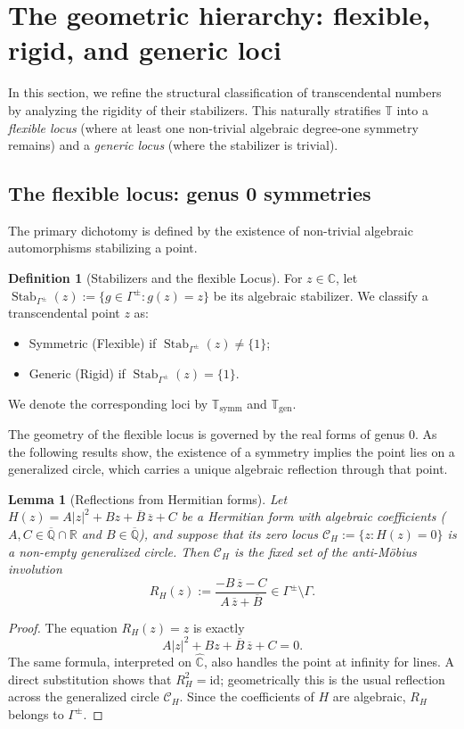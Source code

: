 \documentclass[11pt,a4paper]{article}
\theoremstyle{plain}
\newtheorem{lemma}[theorem]{Lemma}
\theoremstyle{definition}
\newtheorem{definition}[theorem]{Definition}
\newcommand{\C}{\mathbb{C}}
\newcommand{\id}{\mathrm{id}}
\newcommand{\R}{\mathbb{R}}
\newcommand{\rsphere}{\hat{\mathbb{C}}}
\newcommand{\Stab}{\operatorname{Stab}}
\newcommand{\Alg}{\overline{\mathbb{Q}}}
\newcommand{\trans}{\mathbb{T}}
\newcommand{\Tc}{\trans}
\newcommand{\ssymm}{\Tc_{\mathrm{symm}}}
\newcommand{\sgen}{\Tc_{\mathrm{gen}}}
\begin{document}
\section{The geometric hierarchy: flexible, rigid, and generic loci}\label{sec:symmetric-generic}

In this section, we refine the structural classification of transcendental numbers by analyzing the rigidity of their stabilizers. This naturally stratifies $\Tc$ into a \textit{flexible locus} (where at least one non-trivial algebraic degree-one symmetry remains) and a \textit{generic locus} (where the stabilizer is trivial).

\subsection{The flexible locus: genus 0 symmetries}

The primary dichotomy is defined by the existence of non-trivial algebraic automorphisms stabilizing a point.

\begin{definition}[Stabilizers and the flexible Locus]\label{def:stabilizer}
	For $z\in\C$, let $\Stab_{\Gamma^{\pm}}(z):=\{g\in\Gamma^{\pm}:g(z)=z\}$ be its algebraic stabilizer. We classify a transcendental point $z$ as:
	\begin{itemize}[leftmargin=2em]
		\item Symmetric (Flexible) if $\Stab_{\Gamma^{\pm}}(z)\neq\{1\}$;
		\item Generic (Rigid) if $\Stab_{\Gamma^{\pm}}(z)=\{1\}$.
	\end{itemize}
	We denote the corresponding loci by $\ssymm$ and $\sgen$.
\end{definition}

The geometry of the flexible locus is governed by the real forms of genus $0$. As the following results show, the existence of a symmetry implies the point lies on a generalized circle, which carries a unique algebraic reflection through that point.

\begin{lemma}[Reflections from Hermitian forms]\label{lem:R_H}
	Let $H(z)=A|z|^2+Bz+\overline{B}\,\overline{z}+C$ be a Hermitian form with algebraic coefficients ($A,C\in\Alg\cap\R$ and $B\in\Alg$), and suppose that its zero locus $\mathcal{C}_H:=\{z: H(z)=0\}$ is a non-empty generalized circle. Then $\mathcal{C}_H$ is the fixed set of the anti-Möbius involution
	\[
		R_H(z):=\frac{-B\,\overline{z}-C}{A\,\overline{z}+\overline{B}}\in\Gamma^{\pm}\setminus\Gamma.
	\]
\end{lemma}
\begin{proof}
	The equation $R_H(z)=z$ is exactly
	\[
		A|z|^2+Bz+\overline B\,\overline z+C=0.
	\]
	The same formula, interpreted on $\rsphere$, also handles the point at infinity for lines. A direct substitution shows that $R_H^2=\id$; geometrically this is the usual reflection across the generalized circle $\mathcal C_H$. Since the coefficients of $H$ are algebraic, $R_H$ belongs to $\Gamma^{\pm}$.
\end{proof}
\end{document}

